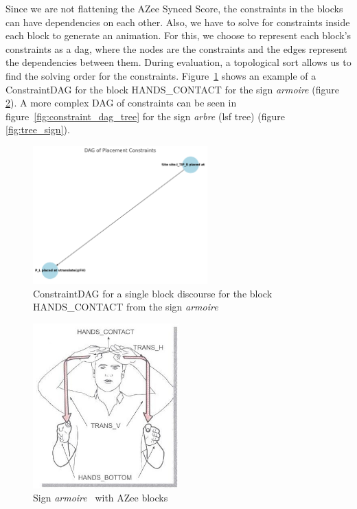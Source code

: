 \documentclass[../../main.tex]{subfiles}
\begin{document}
Since we are not flattening the AZee Synced Score, the constraints in the blocks can have dependencies on each other. Also, we have to solve for constraints inside each block to generate an animation. For this, we choose to represent each block's constraints as a \gls{dag}, where the nodes are the constraints and the edges represent the dependencies between them. During evaluation, a topological sort allows us to find the solving order for the constraints. Figure~\ref{fig:constraint_dag_armoire} shows an example of a ConstraintDAG for the block HANDS\_CONTACT for the sign \emph{armoire} (figure \ref{fig:armoire_sign}). A more complex DAG of constraints can be seen in figure~\ref{fig:constraint_dag_tree} for the sign \emph{arbre} (\gls{lsf} tree) (figure \ref{fig:tree_sign}).

\begin{figure}[h]
    \centering
    \includegraphics[width=0.6\textwidth]{chapters/multi_track/images/constraint_dag_cupboard.png}
    \caption{ConstraintDAG for a single block discourse for the block HANDS\_CONTACT from the sign \emph{armoire}}
    \label{fig:constraint_dag_armoire}
\end{figure}

\begin{figure}[h]
    \centering
    \includegraphics[width=0.5\textwidth]{chapters/multi_track/images/cupboard.jpg}
    \caption{Sign \emph{armoire}~\cite{moody97} with AZee blocks}
    \label{fig:armoire_sign}
\end{figure}
\end{document}
